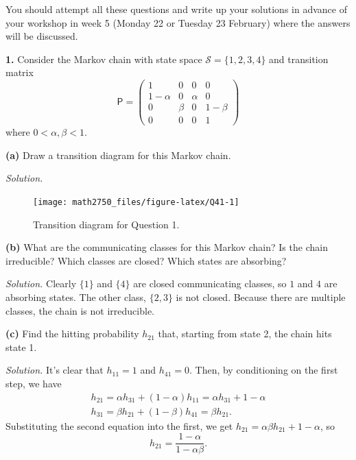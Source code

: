 \documentclass[
  a4paper,
]{article}
\theoremstyle{definition}
\theoremstyle{definition}
\theoremstyle{definition}
\theoremstyle{remark}
\begin{document}
You should attempt all these questions and write up your solutions in advance of your workshop in week 5 (Monday 22 or Tuesday 23 February) where the answers will be discussed.

\textbf{1.} Consider the Markov chain with state space \(\mathcal S = \{1,2,3,4\}\) and transition matrix
\[ \mathsf P = \begin{pmatrix} 1 & 0 & 0 & 0 \\
1-\alpha & 0 & \alpha & 0 \\
0 & \beta & 0 & 1-\beta \\
0 & 0 & 0 & 1 \end{pmatrix}   \]
where \(0 < \alpha, \beta < 1\).

\textbf{(a)} Draw a transition diagram for this Markov chain.

\begin{myanswers}

\emph{Solution.}

\begin{figure}

{\centering \texttt{[image: math2750\_files/figure-latex/Q41-1]} 

}

\caption{Transition diagram for Question 1.}\label{fig:Q41}
\end{figure}

\end{myanswers}

\textbf{(b)} What are the communicating classes for this Markov chain? Is the chain irreducible? Which classes are closed? Which states are absorbing?

\begin{myanswers}
\emph{Solution.} Clearly \(\{1\}\) and \(\{4\}\) are closed communicating classes, so \(1\) and \(4\) are absorbing states. The other class, \(\{2,3\}\) is not closed. Because there are multiple classes, the chain is not irreducible.

\end{myanswers}

\textbf{(c)} Find the hitting probability \(h_{21}\) that, starting from state 2, the chain hits state 1.

\begin{myanswers}
\emph{Solution.} It's clear that \(h_{11} = 1\) and \(h_{41} = 0\). Then, by conditioning on the first step, we have
\begin{gather*}
    h_{21} = \alpha h_{31} + (1-\alpha) h_{11} = \alpha h_{31} + 1 - \alpha \\
    h_{31} = \beta h_{21} + (1-\beta) h_{41} = \beta h_{21} .
    \end{gather*}
Substituting the second equation into the first, we get \(h_{21} = \alpha\beta h_{21} + 1 - \alpha\), so
\[ h_{21} = \frac{1-\alpha}{1-\alpha\beta}  . \]

\end{myanswers}
\end{document}
